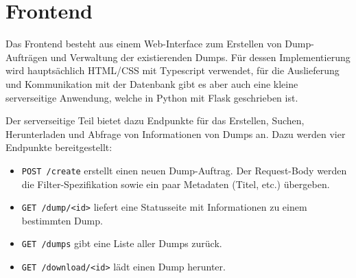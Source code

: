 
\section{Frontend}
Das Frontend besteht aus einem Web-Interface zum Erstellen von Dump-Aufträgen und Verwaltung der existierenden Dumps.
Für dessen Implementierung wird hauptsächlich HTML/CSS mit Typescript verwendet, für die Auslieferung und Kommunikation mit der Datenbank gibt es aber auch eine kleine serverseitige Anwendung, welche in Python mit Flask geschrieben ist.

Der serverseitige Teil bietet dazu Endpunkte für das Erstellen, Suchen, Herunterladen und Abfrage von Informationen von Dumps an. Dazu werden vier Endpunkte bereitgestellt:
\begin{itemize}
\item \verb|POST /create| erstellt einen neuen Dump-Auftrag. Der Request-Body werden die Filter-Spezifikation sowie ein paar Metadaten (Titel, etc.) übergeben.
\item \verb|GET /dump/<id>| liefert eine Statusseite mit Informationen zu einem bestimmten Dump.
\item \verb|GET /dumps| gibt eine Liste aller Dumps zurück.
\item \verb|GET /download/<id>| lädt einen Dump herunter.
\end{itemize}

